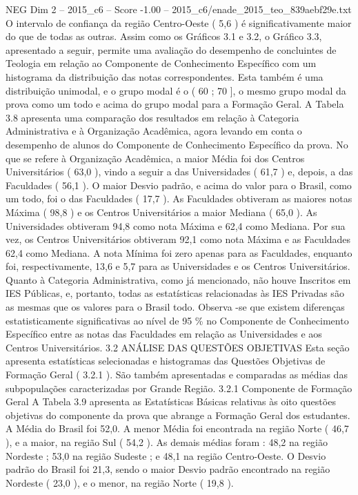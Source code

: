 \begin{textsample}{NEG Dim 2 – 2015\_c6 – Score -1.00 – 2015\_c6/enade\_2015\_teo\_839aebf29e.txt}
O intervalo de confiança da região Centro-Oeste ( 5,6 ) é significativamente maior do que de todas as outras.
Assim como os Gráficos 3.1 e 3.2, o Gráfico 3.3, apresentado a seguir, permite uma avaliação do desempenho de concluintes de Teologia em relação ao Componente de Conhecimento Específico com um histograma da distribuição das notas correspondentes.
Esta também é uma distribuição unimodal, e o grupo modal é o ( 60 ; 70 ], o mesmo grupo modal da prova como um todo e acima do grupo modal para a Formação Geral.
A Tabela 3.8 apresenta uma comparação dos resultados em relação à Categoria Administrativa e à Organização Acadêmica, agora levando em conta o desempenho de alunos do Componente de Conhecimento Específico da prova.
No que se refere à Organização Acadêmica, a maior Média foi dos Centros Universitários ( 63,0 ), vindo a seguir a das Universidades ( 61,7 ) e, depois, a das Faculdades ( 56,1 ).
O maior Desvio padrão, e acima do valor para o Brasil, como um todo, foi o das Faculdades ( 17,7 ).
As Faculdades obtiveram as maiores notas Máxima ( 98,8 ) e os Centros Universitários a maior Mediana ( 65,0 ).
As Universidades obtiveram 94,8 como nota Máxima e 62,4 como Mediana.
Por sua vez, os Centros Universitários obtiveram 92,1 como nota Máxima e as Faculdades 62,4 como Mediana.
A nota Mínima foi zero apenas para as Faculdades, enquanto foi, respectivamente, 13,6 e 5,7 para as Universidades e os Centros Universitários.
Quanto à Categoria Administrativa, como já mencionado, não houve Inscritos em IES Públicas, e, portanto, todas as estatísticas relacionadas às IES Privadas são as mesmas que os valores para o Brasil todo.
Observa -se que existem diferenças estatisticamente significativas ao nível de 95 \% no Componente de Conhecimento Específico entre as notas das Faculdades em relação as Universidades e aos Centros Universitários. 3.2 ANÁLISE DAS QUESTÕES OBJETIVAS Esta seção apresenta estatísticas selecionadas e histogramas das Questões Objetivas de Formação Geral ( 3.2.1 ).
São também apresentadas e comparadas as médias das subpopulações caracterizadas por Grande Região. 3.2.1 Componente de Formação Geral A Tabela 3.9 apresenta as Estatísticas Básicas relativas às oito questões objetivas do componente da prova que abrange a Formação Geral dos estudantes.
A Média do Brasil foi 52,0.
A menor Média foi encontrada na região Norte ( 46,7 ), e a maior, na região Sul ( 54,2 ).
As demais médias foram : 48,2 na região Nordeste ; 53,0 na região Sudeste ; e 48,1 na região Centro-Oeste.
O Desvio padrão do Brasil foi 21,3, sendo o maior Desvio padrão encontrado na região Nordeste ( 23,0 ), e o menor, na região Norte ( 19,8 ).

\end{textsample}

